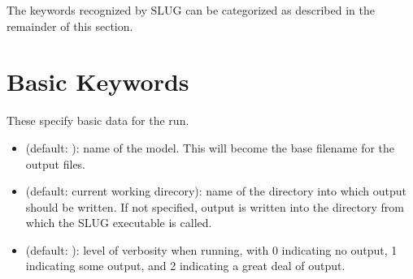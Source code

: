 \documentclass[letterpaper,10pt,english]{sphinxmanual}
\begin{document}
The keywords recognized by SLUG can be categorized as described in the remainder of this section.


\section{Basic Keywords}
\label{\detokenize{parameters:ssec-basic-keywords}}\label{\detokenize{parameters:basic-keywords}}
These specify basic data for the run.
\begin{itemize}
\item {} 
 (default: ): name of the model. This will become the base filename for the output files.

\item {} 
 (default: current working direcory): name of the directory into which output should be written. If not specified, output is written into the directory from which the SLUG executable is called.

\item {} 
 (default: ): level of verbosity when running, with 0 indicating no output, 1 indicating some output, and 2 indicating a great deal of output.

\end{itemize}
\end{document}
